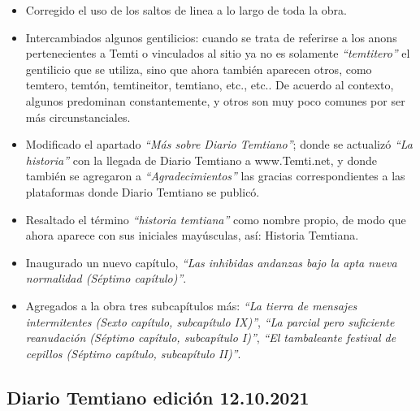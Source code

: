 \documentclass[
  spanish,
]{book}
\begin{document}
\begin{itemize}
\item
  Corregido el uso de los saltos de linea a lo largo de toda la obra.
\item
  Intercambiados algunos gentilicios: cuando se trata de referirse a los anons pertenecientes a Temti o vinculados al sitio ya no es solamente \emph{``temtitero''} el gentilicio que se utiliza, sino que ahora también aparecen otros, como temtero, temtón, temtineitor, temtiano, etc., etc.. De acuerdo al contexto, algunos predominan constantemente, y otros son muy poco comunes por ser más circunstanciales.
\item
  Modificado el apartado \emph{``Más sobre Diario Temtiano''}; donde se actualizó \emph{``La historia''} con la llegada de Diario Temtiano a www.Temti.net, y donde también se agregaron a \emph{``Agradecimientos''} las gracias correspondientes a las plataformas donde Diario Temtiano se publicó.
\item
  Resaltado el término \emph{``historia temtiana''} como nombre propio, de modo que ahora aparece con sus iniciales mayúsculas, así: Historia Temtiana.
\item
  Inaugurado un nuevo capítulo, \emph{``Las inhibidas andanzas bajo la apta nueva normalidad (Séptimo capítulo)''}.
\item
  Agregados a la obra tres subcapítulos más: \emph{``La tierra de mensajes intermitentes (Sexto capítulo, subcapítulo IX)''}, \emph{``La parcial pero suficiente reanudación (Séptimo capítulo, subcapítulo I)''}, \emph{``El tambaleante festival de cepillos (Séptimo capítulo, subcapítulo II)''}.
\end{itemize}

\hypertarget{diario-temtiano-ediciuxf3n-12.10.2021}{%
\subsection*{Diario Temtiano edición 12.10.2021}\label{diario-temtiano-ediciuxf3n-12.10.2021}}
\end{document}
